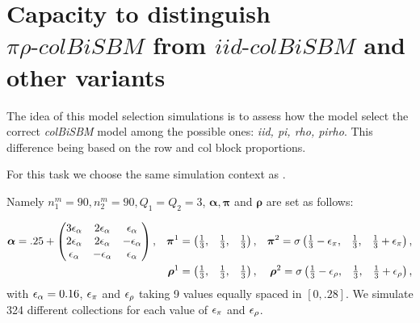 \hypertarget{capacity-to-distinguish-pirhotext-colbisbm-from-iidtext-colbisbm-and-other-variants}{%
\section{\texorpdfstring{Capacity to distinguish
\(\pi\rho\text{-}colBiSBM\) from \(iid\text{-}colBiSBM\) and other
variants}{Capacity to distinguish \textbackslash pi\textbackslash rho\textbackslash text\{-\}colBiSBM from iid\textbackslash text\{-\}colBiSBM and other variants}}\label{capacity-to-distinguish-pirhotext-colbisbm-from-iidtext-colbisbm-and-other-variants}}

The idea of this model selection simulations is to assess how the model
select the correct \emph{colBiSBM} model among the possible ones:
\textit{iid, pi, rho, pirho}. This difference being based on the row and
col block proportions.

For this task we choose the same simulation context as
\cite{chabert-liddellLearningCommonStructures2023}.

Namely \(n_{1}^{m} = 90, n_{2}^{m} = 90, Q_1 = Q_2 = 3\),
\(\bm{\alpha}, \bm{\pi}\) and \(\bm{\rho}\) are set as follows:

\begin{align*}
    \bm{\alpha} =.25 +  \begin{pmatrix}
                        3 \eps[\alpha] & 2 \eps[\alpha] & \eps[\alpha] \\
                        2 \eps[\alpha] & 2 \eps[\alpha] & - \eps[\alpha] \\
                        \eps[\alpha] & - \eps[\alpha] & \eps[\alpha]
                    \end{pmatrix}, & & \bm{\pi}^1 = \begin{pmatrix}
                        \frac{1}{3}, & \frac{1}{3}, & \frac{1}{3}
                    \end{pmatrix}, & & \bm{\pi}^2 = \sigma\begin{pmatrix}
                        \frac{1}{3} - \eps[\pi], & \frac{1}{3}, & \frac{1}{3} + \eps[\pi]
                    \end{pmatrix},\\
    & & \bm{\rho}^1 = \begin{pmatrix}
                        \frac{1}{3}, & \frac{1}{3}, & \frac{1}{3}
                    \end{pmatrix}, & & \bm{\rho}^2 = \sigma\begin{pmatrix}
                        \frac{1}{3} - \eps[\rho], & \frac{1}{3}, & \frac{1}{3} + \eps[\rho]
                    \end{pmatrix},
\end{align*} with \(\eps[\alpha] = 0.16\), \(\eps[\pi]\) and
\(\eps[\rho]\) taking 9 values equally spaced in
\(\left[ 0, .28\right]\). We simulate 324 different collections for each
value of \(\eps[\pi]\) and \(\eps[\rho]\).

